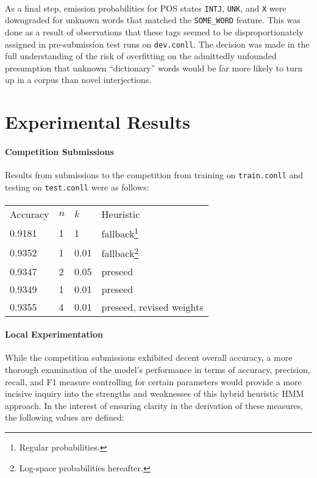 \documentclass[11pt,a4paper]{article}
\begin{document}
\paragraph{}
As a final step, emission probabilities for POS states \texttt{INTJ}, \texttt{UNK},
and \texttt{X} were downgraded for unknown words that matched the \texttt{SOME\_WORD}
feature. This was done as a result of observations that these tags seemed to be
disproportionately assigned in pre-submission test runs on \texttt{dev.conll}.
The decision was made in the full understanding of the risk of overfitting on the
admittedly unfounded presumption that unknown ``dictionary'' words would be far more
likely to turn up in a corpus than novel interjections.

\section{Experimental Results}

\paragraph{Competition Submissions}
Results from submissions to the competition from training on \texttt{train.conll}
and testing on \texttt{test.conll} were as follows:

\paragraph{}
{\small
\begin{tabular}{llll}
  Accuracy & $n$ & $k$ & Heuristic \\
  0.9181 & 1 & 1 & fallback\footnote{Regular probabilities.} \\
  0.9352 & 1 & 0.01 & fallback\footnote{Log-space probabilities hereafter.} \\
  0.9347 & 2 & 0.05 & preseed \\
  0.9349 & 1 & 0.01 & preseed \\
  0.9355 & 4 & 0.01 & preseed, revised weights
\end{tabular}}

\paragraph{Local Experimentation}
While the competition submissions exhibited decent overall accuracy,
a more thorough examination of the model's performance in
terms of accuracy, precision, recall, and F1 measure controlling
for certain parameters would provide a more incisive inquiry
into the strengths and weaknesses of this hybrid heuristic HMM approach.
In the interest of ensuring clarity in the derivation of these measures,
the following values are defined:
\end{document}
